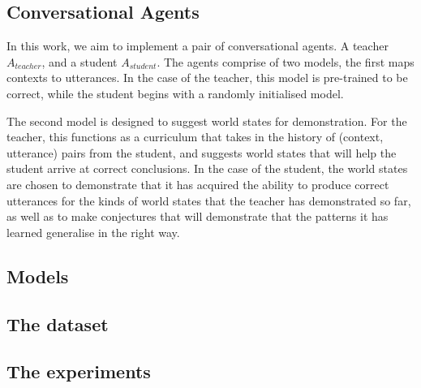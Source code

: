 \subsection{Conversational Agents}

In this work, we aim to implement a pair of conversational agents. A teacher $A_{teacher}$, and a student $A_{student}$. The agents comprise of two models, the first maps contexts to utterances. In the case of the teacher, this model is pre-trained to be correct, while the student begins with a randomly initialised model.

The second model is designed to suggest world states for demonstration. For the teacher, this functions as a curriculum that takes in the history of (context, utterance) pairs from the student, and suggests world states that will help the student arrive at correct conclusions. In the case of the student, the world states are chosen to demonstrate that it has acquired the ability to produce correct utterances for the kinds of world states that the teacher has demonstrated so far, as well as to make conjectures that will demonstrate that the patterns it has learned generalise in the right way.

\subsection{Models}

\subsection{The dataset}

\subsection{The experiments}
